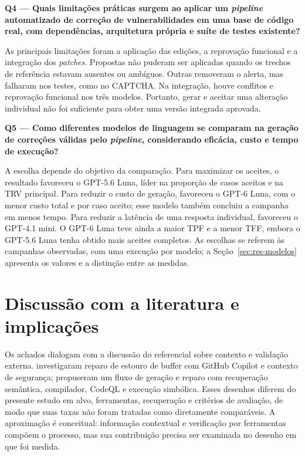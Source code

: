 \textbf{Q4 --- Quais limitações práticas surgem ao aplicar um \textit{pipeline} automatizado de correção de vulnerabilidades em uma base de código real, com dependências, arquitetura própria e suíte de testes existente?}\nopagebreak[4]

As principais limitações foram a aplicação das edições, a reprovação funcional e a integração dos \textit{patches}. Propostas não puderam ser aplicadas quando os trechos de referência estavam ausentes ou ambíguos. Outras removeram o alerta, mas falharam nos testes, como no CAPTCHA. Na integração, houve conflitos e reprovação funcional nos três modelos. Portanto, gerar e aceitar uma alteração individual não foi suficiente para obter uma versão integrada aprovada.

\textbf{Q5 --- Como diferentes modelos de linguagem se comparam na geração de correções válidas pelo \textit{pipeline}, considerando eficácia, custo e tempo de execução?}\nopagebreak[4]

A escolha depende do objetivo da comparação. Para maximizar os aceites, o resultado favoreceu o GPT-5.6 Luna, líder na proporção de casos aceitos e na TRV principal. Para reduzir o custo de geração, favoreceu o GPT-6 Luna, com o menor custo total e por caso aceito; esse modelo também concluiu a campanha em menos tempo. Para reduzir a latência de uma resposta individual, favoreceu o GPT-4.1 mini. O GPT-6 Luna teve ainda a maior TPF e a menor TFF, embora o GPT-5.6 Luna tenha obtido mais aceites completos. As escolhas se referem às campanhas observadas, com uma execução por modelo; a Seção~\ref{sec:res-modelos} apresenta os valores e a distinção entre as medidas.

\section{Discussão com a literatura e implicações}

\label{sec:res-literatura}

Os achados dialogam com a discussão do referencial sobre contexto e validação externa.  investigaram reparo de estouro de buffer com GitHub Copilot e contexto de segurança;  propuseram um fluxo de geração e reparo com recuperação semântica, compilador, CodeQL e execução simbólica. Esses desenhos diferem do presente estudo em alvo, ferramentas, recuperação e critérios de avaliação, de modo que suas taxas não foram tratadas como diretamente comparáveis. A aproximação é conceitual: informação contextual e verificação por ferramentas compõem o processo, mas sua contribuição precisa ser examinada no desenho em que foi medida.

